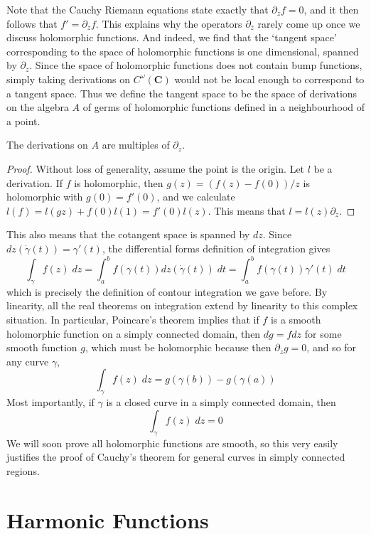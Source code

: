 Note that the Cauchy Riemann equations state exactly that $\partial_{\overline{z}} f = 0$, and it then follows that $f' = \partial_z f$. This explains why the operators $\partial_{\overline{z}}$ rarely come up once we discuss holomorphic functions. And indeed, we find that the `tangent space' corresponding to the space of holomorphic functions is one dimensional, spanned by $\partial_z$. Since the space of holomorphic functions does not contain bump functions, simply taking derivations on $C^\omega(\mathbf{C})$ would not be local enough to correspond to a tangent space. Thus we define the tangent space to be the space of derivations on the algebra $A$ of germs of holomorphic functions defined in a neighbourhood of a point.

\begin{theorem}
    The derivations on $A$ are multiples of $\partial_z$.
\end{theorem}
\begin{proof}
    Without loss of generality, assume the point is the origin. Let $l$ be a derivation. If $f$ is holomorphic, then $g(z) = (f(z) - f(0))/z$ is holomorphic with $g(0) = f'(0)$, and we calculate $l(f) = l(gz) + f(0)l(1) = f'(0)l(z)$. This means that $l = l(z) \partial_z$.
\end{proof}

This also means that the cotangent space is spanned by $dz$. Since $dz(\dot{\gamma}(t)) = \gamma'(t)$, the differential forms definition of integration gives
%
\[ \int_\gamma f(z)\; dz = \int_a^b f(\gamma(t)) dz \left(\dot{\gamma}(t) \right)\; dt = \int_a^b f(\gamma(t)) \gamma'(t)\; dt \]
%
which is precisely the definition of contour integration we gave before. By linearity, all the real theorems on integration extend by linearity to this complex situation. In particular, Poincare's theorem implies that if $f$ is a smooth holomorphic function on a simply connected domain, then $dg = f dz$ for some smooth function $g$, which must be holomorphic because then $\partial_{\overline{z}} g = 0$, and so for any curve $\gamma$,
%
\[ \int_\gamma f(z)\; dz = g(\gamma(b)) - g(\gamma(a)) \]
%
Most importantly, if $\gamma$ is a closed curve in a simply connected domain, then
%
\[ \int_\gamma f(z)\; dz = 0 \]
%
We will soon prove all holomorphic functions are smooth, so this very easily justifies the proof of Cauchy's theorem for general curves in simply connected regions.




\section{Harmonic Functions}

